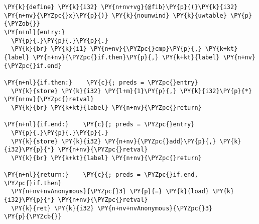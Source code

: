\begin{Verbatim}[commandchars=\\\{\}]
\PY{k}{define} \PY{k}{i32} \PY{n+nv+vg}{@fib}\PY{p}{(}\PY{k}{i32} \PY{n+nv}{\PYZpc{}x}\PY{p}{)} \PY{k}{nounwind} \PY{k}{uwtable} \PY{p}{\PYZob{}}
\PY{n+nl}{entry:}
  \PY{p}{.}\PY{p}{.}\PY{p}{.}
  \PY{k}{br} \PY{k}{i1} \PY{n+nv}{\PYZpc{}cmp}\PY{p}{,} \PY{k+kt}{label} \PY{n+nv}{\PYZpc{}if.then}\PY{p}{,} \PY{k+kt}{label} \PY{n+nv}{\PYZpc{}if.end}

\PY{n+nl}{if.then:}    \PY{c}{; preds = \PYZpc{}entry}
  \PY{k}{store} \PY{k}{i32} \PY{l+m}{1}\PY{p}{,} \PY{k}{i32}\PY{p}{*} \PY{n+nv}{\PYZpc{}retval}
  \PY{k}{br} \PY{k+kt}{label} \PY{n+nv}{\PYZpc{}return}

\PY{n+nl}{if.end:}    \PY{c}{; preds = \PYZpc{}entry}
  \PY{p}{.}\PY{p}{.}\PY{p}{.}
  \PY{k}{store} \PY{k}{i32} \PY{n+nv}{\PYZpc{}add}\PY{p}{,} \PY{k}{i32}\PY{p}{*} \PY{n+nv}{\PYZpc{}retval}
  \PY{k}{br} \PY{k+kt}{label} \PY{n+nv}{\PYZpc{}return}

\PY{n+nl}{return:}    \PY{c}{; preds = \PYZpc{}if.end, \PYZpc{}if.then}
  \PY{n+nv+nvAnonymous}{\PYZpc{}3} \PY{p}{=} \PY{k}{load} \PY{k}{i32}\PY{p}{*} \PY{n+nv}{\PYZpc{}retval}
  \PY{k}{ret} \PY{k}{i32} \PY{n+nv+nvAnonymous}{\PYZpc{}3}
\PY{p}{\PYZcb{}}
\end{Verbatim}
